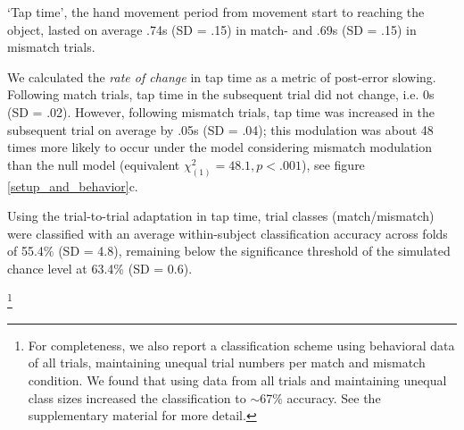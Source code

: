 `Tap time', the hand movement period from movement start to reaching the object, lasted on average .74s (SD = .15) in match- and .69s (SD = .15) in mismatch trials. 


We calculated the \textit{rate of change} in tap time as a metric of post-error slowing. Following match trials, tap time in the subsequent trial did not change, i.e. 0s (SD = .02). However, following mismatch trials, tap time was increased in the subsequent trial on average by .05s (SD = .04); this modulation was about 48 times more likely to occur under the model considering mismatch modulation than the null model (equivalent ${\chi}^2_{(1)} = 48.1, p<.001$), see figure \ref{setup_and_behavior}c. 



Using the trial-to-trial adaptation in tap time, trial classes (match/mismatch) were classified with an average within-subject classification accuracy across folds of 55.4\% (SD = 4.8), remaining below the significance threshold of the simulated chance level at 63.4\% (SD = 0.6).

\footnote{For completeness, we also report a classification scheme using behavioral data of all trials, maintaining unequal trial numbers per match and mismatch condition. We found that using data from all trials and maintaining unequal class sizes increased the classification to $\sim$67\% accuracy. See the supplementary material for more detail.}









